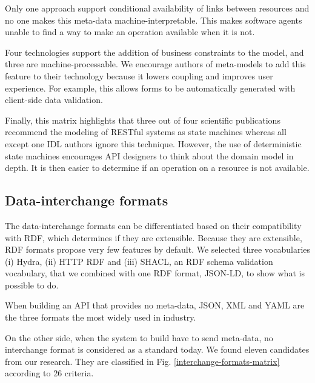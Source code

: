 Only one approach \cite{Schreier:2011:MRA:1967428.1967434} support conditional availability of links between resources and no one makes this meta-data machine-interpretable. This makes software agents unable to find a way to make an operation available when it is not.

Four technologies support the addition of business constraints to the model, and three are machine-processable. We encourage authors of meta-models to add this feature to their technology because it lowers coupling and improves user experience. For example, this allows forms to be automatically generated with client-side data validation.

Finally, this matrix highlights that three out of four scientific publications recommend the modeling of RESTful systems as state machines whereas all except one IDL authors ignore this technique. However, the use of deterministic state machines encourages API designers to think about the domain model in depth. It is then easier to determine if an operation on a resource is not available.

\subsection{Data-interchange formats}

The data-interchange formats can be differentiated based on their compatibility with RDF, which determines if they are extensible. Because they are extensible, RDF formats propose very few features by default. We selected three vocabularies (i) Hydra, (ii) HTTP RDF and (iii) SHACL, an RDF schema validation vocabulary, that we combined with one RDF format, JSON-LD, to show what is possible to do.

When building an API that provides no meta-data, JSON, XML and YAML are the three formats the most widely used in industry.

On the other side, when the system to build have to send meta-data, no interchange format is considered as a standard today. We found eleven candidates from our research. They are classified in Fig. \ref{interchange-formats-matrix} according to 26 criteria. %

